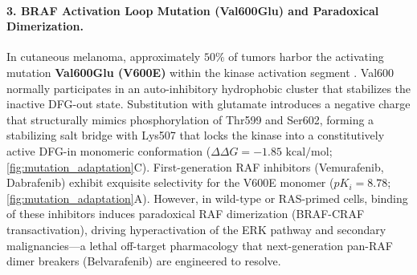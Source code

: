 \documentclass{article}
\theoremstyle{definition}
\begin{document}
\paragraph{3. BRAF Activation Loop Mutation (Val600Glu) and Paradoxical Dimerization.}
In cutaneous melanoma, approximately $50\%$ of tumors harbor the activating mutation \textbf{Val600Glu (V600E)} within the kinase activation segment \citep{davies2002mutations}. Val600 normally participates in an auto-inhibitory hydrophobic cluster that stabilizes the inactive DFG-out state. Substitution with glutamate introduces a negative charge that structurally mimics phosphorylation of Thr599 and Ser602, forming a stabilizing salt bridge with Lys507 that locks the kinase into a constitutively active DFG-in monomeric conformation ($\Delta\Delta G = -1.85\text{ kcal/mol}$; \cref{fig:mutation_adaptation}C). First-generation RAF inhibitors (Vemurafenib, Dabrafenib) exhibit exquisite selectivity for the V600E monomer ($pK_i = 8.78$; \cref{fig:mutation_adaptation}A). However, in wild-type or RAS-primed cells, binding of these inhibitors induces paradoxical RAF dimerization (BRAF-CRAF transactivation), driving hyperactivation of the ERK pathway and secondary malignancies---a lethal off-target pharmacology that next-generation pan-RAF dimer breakers (Belvarafenib) are engineered to resolve.
\end{document}
